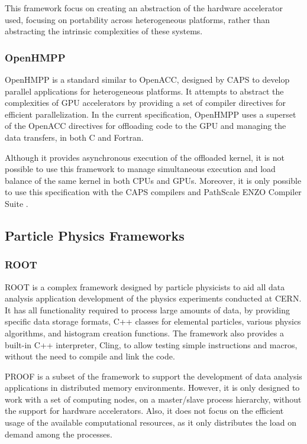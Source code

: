 This framework focus on creating an abstraction of the hardware accelerator used, focusing on portability across heterogeneous platforms, rather than abstracting the intrinsic complexities of these systems.

\subsubsection*{OpenHMPP}

OpenHMPP \cite{OpenHMPP} is a standard similar to OpenACC, designed by CAPS \cite{CAPS} to develop parallel applications for heterogeneous platforms. It attempts to abstract the complexities of GPU accelerators by providing a set of compiler directives for efficient parallelization. In the current specification, OpenHMPP uses a superset of the OpenACC directives for offloading code to the GPU and managing the data transfers, in both C and Fortran.

Although it provides asynchronous execution of the offloaded kernel, it is not possible to use this framework to manage simultaneous execution and load balance of the same kernel in both CPUs and GPUs. Moreover, it is only possible to use this specification with the CAPS compilers and PathScale ENZO Compiler Suite \cite{ENZO}.

\subsection{Particle Physics Frameworks}
\label{particle_frameworks}

\subsubsection*{ROOT}

ROOT \cite{CERN:ROOT} is a complex framework designed by particle physicists to aid all data analysis application development of the physics experiments conducted at CERN. It has all functionality required to process large amounts of data, by providing specific data storage formats, C++ classes for elemental particles, various physics algorithms, and histogram creation functions. The framework also provides a built-in C++ interpreter, Cling, to allow testing simple instructions and macros, without the need to compile and link the code.

PROOF is a subset of the framework to support the development of data analysis applications in distributed memory environments. However, it is only designed to work with a set of computing nodes, on a master/slave process hierarchy, without the support for hardware accelerators. Also, it does not focus on the efficient usage of the available computational resources, as it only distributes the load on demand among the processes.

